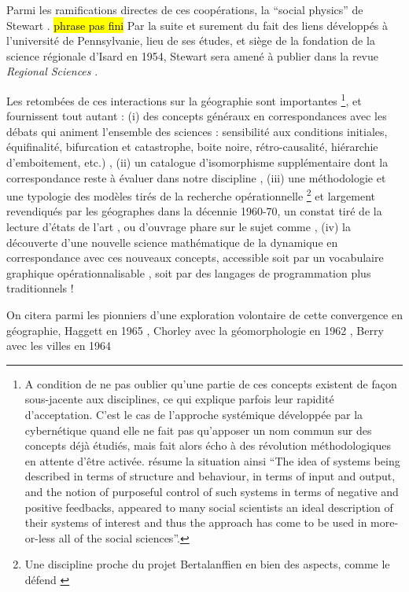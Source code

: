 Parmi les ramifications directes de ces coopérations, la \enquote{social physics} de Stewart \autocite{Stewart1947}. \hl{phrase pas fini}
Par la suite et surement du fait des liens développés à l'université de Pennsylvanie, lieu de ses études, et siège de la fondation de la science régionale d'Isard en 1954, Stewart sera amené à publier dans la revue \textit{Regional Sciences} \autocite{Stewart1958}.

Les retombées de ces interactions sur la géographie sont importantes \footnote{ A condition de ne pas oublier qu'une partie de ces concepts existent de façon sous-jacente aux disciplines, ce qui explique parfois leur rapidité d'acceptation. C'est le cas de l'approche systémique développée par la cybernétique quand elle ne fait pas qu'apposer un nom commun sur des concepts déjà étudiés, mais fait alors écho à des révolution méthodologiques en attente d'être activée. \textcite[5]{Batty1976} résume la situation ainsi \foreignquote{english}{The idea of systems being described in terms of structure and behaviour, in terms of input and output, and the notion of purposeful control of such systems in terms of negative and positive feedbacks, appeared to many social scientists an ideal description of their systems of interest and thus the approach has come to be used in more-or-less all of the social sciences}.}, et fournissent tout autant : (i) des concepts généraux en correspondances avec les débats qui animent l'ensemble des sciences : sensibilité aux conditions initiales, équifinalité, bifurcation et catastrophe, boite noire, rétro-causalité, hiérarchie d'emboitement, etc.) , (ii) un catalogue d'isomorphisme supplémentaire dont la correspondance reste à évaluer dans notre discipline \autocite{Wilson1969}, (iii)  une méthodologie et une typologie des modèles tirés de la recherche opérationnelle \autocite{Ackoff1962} \footnote{Une discipline proche du projet Bertalanffien en bien des aspects, comme le défend \autocite[801]{Pouvreau2013}} et largement revendiqués par les géographes dans la décennie 1960-70, un constat tiré de la lecture  d'états de l'art \autocite{Kohn1970}, ou d'ouvrage phare sur le sujet comme \autocite{Berry1964, Haggett1965}, (iv) la découverte d'une nouvelle science mathématique de la dynamique en correspondance avec ces nouveaux concepts, accessible soit par un vocabulaire graphique opérationnalisable \autocite{Forrester1961}, soit par des langages de programmation plus traditionnels !

On citera parmi les pionniers d'une exploration volontaire de cette convergence en géographie, Haggett en 1965 \autocite{Haggett1965}, Chorley avec la géomorphologie en 1962 \autocite{Chorley1962}, Berry avec les villes en 1964 \autocite{Berry1964}

